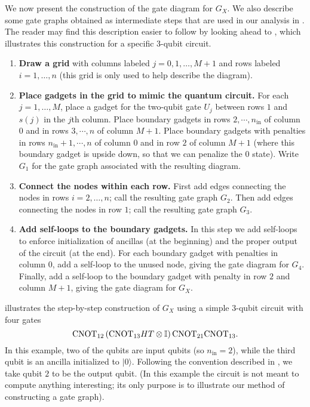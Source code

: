 \documentclass[../thesis-main/thesis-main]{subfiles}
\begin{document}
We now present the construction of the gate diagram for $G_X$.  We also describe some gate graphs obtained as intermediate steps that are used in our analysis in . The reader may find this description easier to follow by looking ahead to , which illustrates this construction for a specific $3$-qubit circuit.

\begin{enumerate}
  \item \textbf{Draw a grid} with columns labeled $j=0,1,\ldots,M+1$ and rows labeled $i=1,\ldots,n$ (this grid is only used to help describe the diagram).
  \item \textbf{Place gadgets in the grid to mimic the quantum circuit.}
For each $j=1,\ldots,M$, place a gadget for the two-qubit gate $U_j$ between rows $1$ and $s(j)$ in the $j$th column.  Place boundary gadgets in rows $2,\cdots,n_{\text{in}}$ of column $0$ and in rows $3,\cdots,n$ of column $M+1$. Place boundary gadgets with penalties in rows $n_{\text{in}}+1,\cdots,n$ of column $0$ and in row $2$ of column $M+1$ (where this boundary gadget is upside down, so that we can penalize the $0$ state). Write $G_{1}$ for the gate graph associated with the resulting diagram.
  \item \textbf{Connect the nodes within each row.}
First add edges connecting the nodes in rows $i=2,\ldots,n$; call the resulting gate graph $G_{2}$. Then add edges connecting the nodes in row $1$; call the resulting gate graph $G_{3}$.
  \item \textbf{Add self-loops to the boundary gadgets.}
In this step we add self-loops to enforce initialization of ancillas (at the beginning) and the proper output of the circuit (at the end). For each boundary gadget with penalties in column $0$, add a self-loop to the unused node, giving the gate diagram for $G_{4}$. Finally, add a self-loop to the boundary gadget with penalty  in row 
$2$ and column $M+1$, giving the gate diagram for $G_X$.
\end{enumerate}

 illustrates the step-by-step construction of $G_X$ using a simple $3$-qubit circuit with four gates 
\begin{equation}
  \mathrm{CNOT}_{12}\left(\mathrm{CNOT}_{13}HT\otimes\mathbb{I}\right)\mathrm{CNOT}_{21}\mathrm{CNOT}_{13}.
\end{equation}
In this example, two of the qubits are input qubits (so $n_{\text{in}}=2$), while the third qubit is an ancilla 
initialized to $|0\rangle$.
Following the convention described in , we take qubit $2$ to be the output qubit. (In this example the circuit is not meant to compute anything interesting; its only purpose is to illustrate our method of constructing a gate graph).
\end{document}
